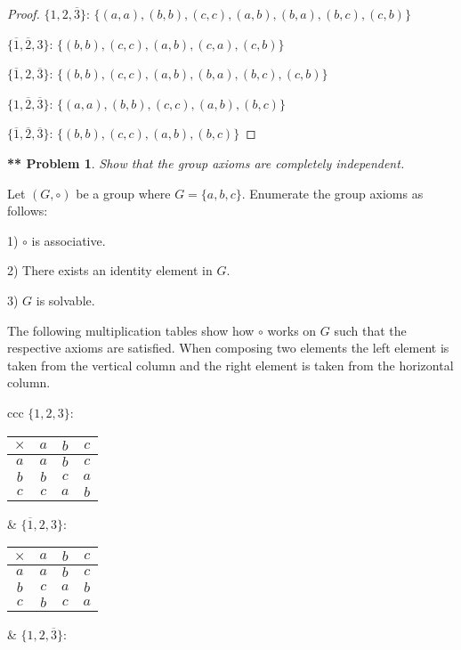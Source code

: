 \documentclass{article}
\newtheorem{**}{** Problem}
\begin{document}
\begin{flushleft}
\begin{proof}
$\{1, 2, \overline{3}\}$: $\{(a,a), (b,b), (c,c), (a,b), (b,a), (b,c), (c,b)\}$\newline

$\{\overline{1}, \overline{2}, 3\}$: $\{(b,b), (c,c), (a,b), (c,a), (c,b)\}$\newline

$\{\overline{1}, 2, \overline{3}\}$: $\{(b,b), (c,c), (a,b), (b,a), (b,c), (c,b)\}$\newline

$\{1, \overline{2}, \overline{3}\}$: $\{(a,a), (b,b), (c,c), (a,b), (b,c)\}$\newline

$\{\overline{1}, \overline{2}, \overline{3}\}$: $\{(b,b), (c,c), (a,b), (b,c)\}$
\end{proof}

\begin{**}
Show that the group axioms are completely independent.
\end{**}
Let $(G, \circ)$ be a group where $G = \{a,b,c\}$. Enumerate the group axioms as follows:\newline

1) $\circ$ is associative.\newline

2) There exists an identity element in $G$.\newline

3) $G$ is solvable.\newline

The following multiplication tables show how $\circ$ works on $G$ such that the respective axioms are satisfied. When composing two elements the left element is taken from the vertical column and the right element is taken from the horizontal column.\newline

\begin{tabular}{ccc}
$\{1,2,3\}$:

\begin{tabular}{|c|c|c|c|}
\hline
$\times$ & $a$ & $b$ & $c$\\
\hline
$a$ & $a$ & $b$ & $c$\\
\hline
$b$ & $b$ & $c$ & $a$\\
\hline
$c$ & $c$ & $a$ & $b$\\
\hline
\end{tabular}
&
$\{\overline{1},2,3\}$:

\begin{tabular}{|c|c|c|c|}
\hline
$\times$ & $a$ & $b$ & $c$\\
\hline
$a$ & $a$ & $b$ & $c$\\
\hline
$b$ & $c$ & $a$ & $b$\\
\hline
$c$ & $b$ & $c$ & $a$\\
\hline
\end{tabular}
&
$\{1,2,\overline{3}\}$:


\end{tabular}
\end{flushleft}
\end{document}
